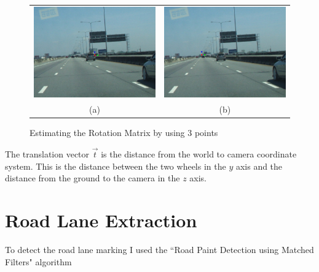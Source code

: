 \begin{figure}
 \centering
 \begin{tabular}{c c}
   \includegraphics[width=80mm]{figures/rotation_after.png} &
   \includegraphics[width=80mm]{figures/rotation_before.png} \\
   (a) & (b) \\
 \end{tabular}
 \caption{Estimating the Rotation Matrix by using 3 points}
 \label{fig:rotation_matrix}
\end{figure}

The translation vector $\vec{t}$ is the distance from the world to camera 
coordinate system. This is the distance between the two wheels in the $y$ axis 
and the distance from the ground to the camera in the $z$ axis.

\section{Road Lane Extraction}
To detect the road lane marking I used the ``Road Paint Detection using Matched
Filters" algorithm 

